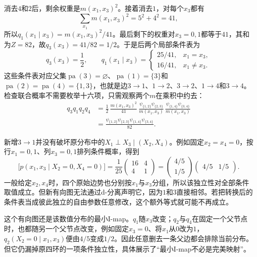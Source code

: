 消去$4$和$2$后，剩余权重是$m(x_1,x_3)^2$。接着消去$1$，对每个$x_3$都有
\[
  \sum_{x_1}m(x_1,x_3)^2=5^2+4^2=41,
\]
所以$q_1(x_1\mid x_3)=m(x_1,x_3)^2/41$。最后剩下的权重对$x_3=0,1$都等于$41$，其和为$Z=82$，故$q_3(x_3)=41/82=1/2$。于是后两个局部条件表为
\begin{equation}
  q_3(x_3)=\frac12,\qquad
  q_1(x_1\mid x_3)=
  \begin{cases}
    25/41,&x_1=x_3,\\
    16/41,&x_1\ne x_3.
  \end{cases}
  \label{eq:pgm-representations-cycle-root-tables}
\end{equation}
这些条件表对应父集$\operatorname{pa}(3)=\varnothing$、$\operatorname{pa}(1)=\{3\}$和$\operatorname{pa}(2)=\operatorname{pa}(4)=\{1,3\}$，也就是边$3\to1$、$1\to2$、$3\to2$、$1\to4$和$3\to4$。检查联合概率不需要枚举十六项，只需观察两个$m$在乘积中约去：
\[
  \begin{aligned}
    q_3q_1q_2q_4
    &=\frac12\,
      \frac{m(x_1,x_3)^2}{41}\,
      \frac{\psi_{\{1,2\}}\psi_{\{2,3\}}}{m(x_1,x_3)}\,
      \frac{\psi_{\{1,4\}}\psi_{\{3,4\}}}{m(x_1,x_3)}\\
    &=\frac{
      \psi_{\{1,2\}}\psi_{\{2,3\}}
      \psi_{\{1,4\}}\psi_{\{3,4\}}}{82}.
  \end{aligned}
\]

新增$3\to1$并没有破坏原分布中的$X_1\perp X_3\mid(X_2,X_4)$。例如固定$x_2=x_4=0$，按行$x_1=0,1$、列$x_3=0,1$排列条件概率，得到
\[
  \bigl[p(x_1,x_3\mid X_2=0,X_4=0)\bigr]
  =\frac1{25}
  \begin{pmatrix}16&4\\4&1\end{pmatrix}
  =
  \begin{pmatrix}4/5\\1/5\end{pmatrix}
  \begin{pmatrix}4/5&1/5\end{pmatrix}.
\]
一般给定$x_2,x_4$时，四个原始边势也分别按$x_1$与$x_3$分组，所以该独立性对全部条件取值成立。但新有向图无法通过d-分离声明它，因为$1$和$3$直接相邻。若把转换后的条件表当成彼此独立的自由参数任意修改，这个额外等式就可能不再成立。

这个有向图还是该数值分布的最小I-map。$q_1$随$x_3$改变；$q_2$与$q_4$在固定一个父节点时，也都随另一个父节点改变，例如固定$x_3=0$、将$x_1$从$0$改为$1$，$q_2(X_2=0\mid x_1,x_3)$便由$4/5$变成$1/2$。因此任意删去一条父边都会排除当前分布。但它仍漏掉原四环的一项条件独立性，具体展示了“最小I-map不必是完美映射”。

